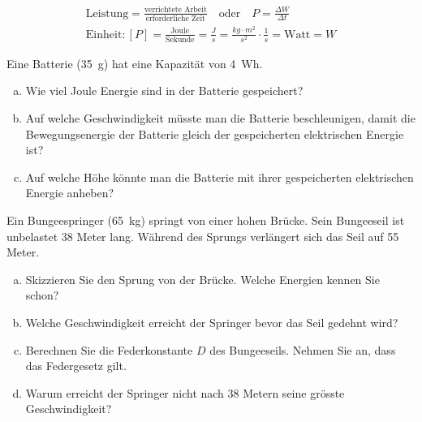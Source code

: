 \documentclass[12pt,a4paper,twoside]{article}
\def\dir{./Aufgaben_Mechanik/}
\newcommand{\Einbinden}[1]{}
\begin{document}
\begin{cbox}
\begin{gather*}
	\text{Leistung} = \frac{\text{verrichtete Arbeit}}{\text{erforderliche Zeit}}\quad\text{oder}\quad P=\frac{\Delta W}{\Delta t}\\
	\text{Einheit}: [P] = \frac{\text{Joule}}{\text{Sekunde}}=\frac{\si{J}}{\si{s}}=\frac{\si{kg}\cdot\si{m^2}}{\si{s^2}}\cdot \frac{1}{\si{s}}=\text{Watt}=\si{W}
\end{gather*}
\end{cbox}


\Einbinden{\dir/leistung01.tex}
\Einbinden{\dir/leistung02.tex}
\Einbinden{\dir/leistung03.tex}
\Einbinden{\dir/leistung04.tex}
\Einbinden{\dir/leistung05.tex}
\Einbinden{\dir/arbeit05.tex}

\newpage


\begin{aufgabe}
	Eine Batterie (\SI{35}{g}) hat eine Kapazität von \SI{4}{Wh}.
	\begin{enumerate} [a)]
		\item Wie viel Joule Energie sind in der Batterie gespeichert?
		\item Auf welche Geschwindigkeit müsste man die Batterie beschleunigen, damit die Bewegungsenergie der
			Batterie gleich der gespeicherten elektrischen Energie ist?
		\item Auf welche Höhe könnte man die Batterie mit ihrer gespeicherten elektrischen Energie anheben?
	\end{enumerate}
\end{aufgabe}



\begin{aufgabe}
	Ein Bungeespringer (\SI{65}{kg}) springt von einer hohen Brücke.
	Sein Bungeeseil ist unbelastet 38 Meter lang. Während des Sprungs verlängert sich das Seil auf 55 Meter.

	\begin{enumerate} [a)]
		\item Skizzieren Sie den Sprung von der Brücke. Welche Energien kennen Sie schon?
		\item Welche Geschwindigkeit erreicht der Springer bevor das Seil gedehnt wird?
		\item Berechnen Sie die Federkonstante $D$ des Bungeeseils. Nehmen Sie an, dass das Federgesetz gilt.
		\item Warum erreicht der Springer nicht nach 38 Metern seine grösste Geschwindigkeit?
	\end{enumerate}
\end{aufgabe}
\end{document}
